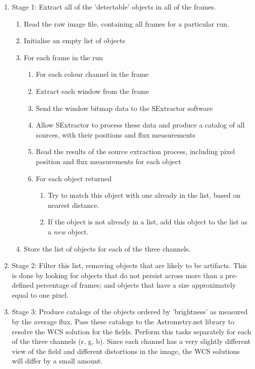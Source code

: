 \begin{enumerate}
	\item Stage 1: Extract all of the 'detectable' objects in all of the frames. 
	\begin{enumerate}
		\item Read the raw image file, containing all frames for a particular run.
		\item Initialise an empty list of objects
		\item For each frame in the run
		\begin{enumerate}
			\item For each colour channel in the frame
			\item Extract each window from the frame
			\item Send the window bitmap data to the SExtractor software
			\item Allow SExtractor to process these data and produce a catalog of all sources, with their positions and flux measurements
			\item Read the results of the source extraction process, including pixel position and flux measurements for each object
			\item For each object returned
			\begin{enumerate} 
				\item Try to match this object with one already in the list, based on nearest distance.
				\item If the object is not already in a list, add this object to the list as a \emph{new} object.
			\end{enumerate}
		\end{enumerate}
		\item Store the list of objects for each of the three channels.
	\end{enumerate}
	\item Stage 2: Filter this list, removing objects that are likely to be artifacts. This is done by looking for objects that do not persist across more than a pre-defined percentage of frames; and objects that have a size approximately equal to one pixel. 
	\item Stage 3: Produce catalogs of the objects ordered by 'brightness' as measured by the average flux. Pass these catalogs to the Astrometry.net library to resolve the WCS solution for the fields. Perform this tasks separately for each of the three channels (r, g, b). Since each channel has a very slightly different view of the field and different distortions in the image, the WCS solutions will differ by a small amount.

\end{enumerate}
